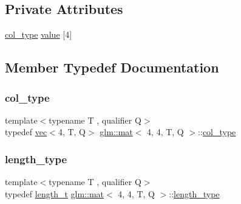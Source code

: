 \subsection*{Private Attributes}
\begin{DoxyCompactItemize}
\item 
\hyperlink{structglm_1_1mat_3_014_00_014_00_01_t_00_01_q_01_4_aad430dc291d0156d573c434be7fdecc1}{col\+\_\+type} \hyperlink{structglm_1_1mat_3_014_00_014_00_01_t_00_01_q_01_4_a43dd26acc0a0d26257b38393edc53328}{value} \mbox{[}4\mbox{]}
\end{DoxyCompactItemize}


\subsection{Member Typedef Documentation}
\mbox{\label{structglm_1_1mat_3_014_00_014_00_01_t_00_01_q_01_4_aad430dc291d0156d573c434be7fdecc1}} 
\subsubsection{\texorpdfstring{col\+\_\+type}{col\_type}}
{\footnotesize\ttfamily template$<$typename T , qualifier Q$>$ \\
typedef \hyperlink{structglm_1_1vec}{vec}$<$4, T, Q$>$ \hyperlink{structglm_1_1mat}{glm\+::mat}$<$ 4, 4, T, Q $>$\+::\hyperlink{structglm_1_1mat_3_014_00_014_00_01_t_00_01_q_01_4_aad430dc291d0156d573c434be7fdecc1}{col\+\_\+type}}

\mbox{\label{structglm_1_1mat_3_014_00_014_00_01_t_00_01_q_01_4_ae06c2957874bbff5701b304668b5cb01}} 
\subsubsection{\texorpdfstring{length\+\_\+type}{length\_type}}
{\footnotesize\ttfamily template$<$typename T , qualifier Q$>$ \\
typedef \hyperlink{namespaceglm_a090a0de2260835bee80e71a702492ed9}{length\+\_\+t} \hyperlink{structglm_1_1mat}{glm\+::mat}$<$ 4, 4, T, Q $>$\+::\hyperlink{structglm_1_1mat_3_014_00_014_00_01_t_00_01_q_01_4_ae06c2957874bbff5701b304668b5cb01}{length\+\_\+type}}

